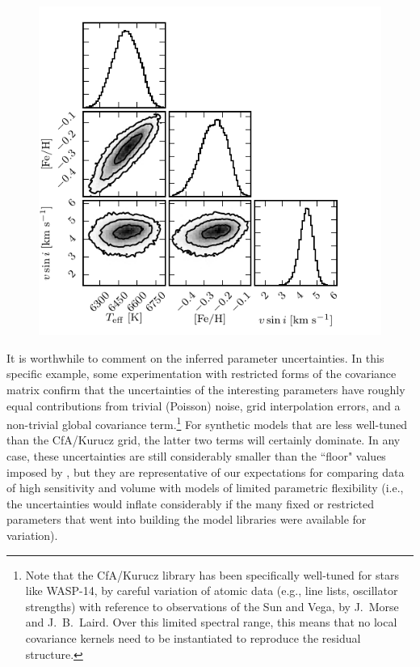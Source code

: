 \documentclass[iop,floatfix,twocolappendix]{emulateapj}
\begin{document}
\begin{figure}[!b]
  \includegraphics{figs/Kurucz_triangle.pdf}
\vspace{-0.5cm}
\end{figure}

It is worthwhile to comment on the inferred parameter uncertainties.  In this specific example, 
some experimentation with restricted forms of the covariance matrix confirm that the uncertainties 
of the interesting parameters have roughly equal contributions from trivial (Poisson) noise, grid 
interpolation errors, and a non-trivial global covariance term.\footnote{Note that the {\sc 
CfA/Kurucz} library has been specifically well-tuned for stars like WASP-14, by careful variation 
of atomic data (e.g., line lists, oscillator strengths) with reference to observations of the Sun 
and Vega, by J.~Morse and J.~B.~Laird.  Over this limited spectral range, this means that no local 
covariance kernels need to be instantiated to reproduce the residual structure.}  For synthetic 
models that are less well-tuned than the {\sc CfA/Kurucz} grid, the latter two terms will certainly 
dominate.  In any case, these uncertainties are still considerably smaller than the ``floor" values 
imposed by \citet{torres12}, but they are representative of our expectations for comparing data of 
high sensitivity and volume with models of limited parametric flexibility (i.e., the uncertainties 
would inflate considerably if the many fixed or restricted parameters that went into building the 
model libraries were available for variation).  
\end{document}
